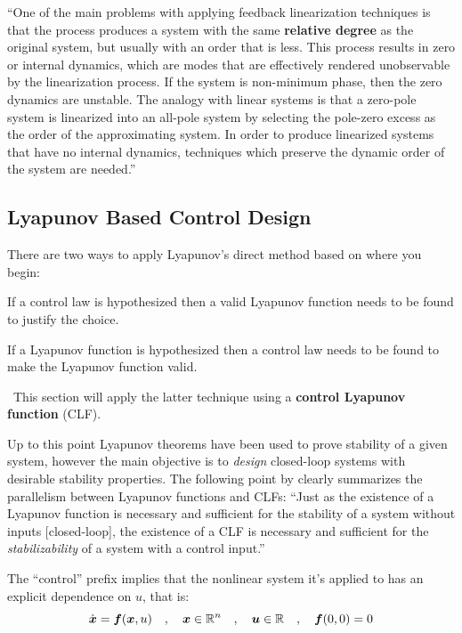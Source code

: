 \documentclass[12pt]{ucthesis}
\begin{document}
``One of the main problems with applying feedback linearization techniques is that the process produces a system with the same \textbf{relative degree} as the original system, but usually with an order that is less. This process results in zero or internal dynamics, which are modes that are effectively rendered unobservable by the linearization process. If the system is non-minimum phase, then the zero dynamics are unstable. The analogy with linear systems is that a zero-pole system is linearized into an all-pole system by selecting the pole-zero excess as the order of the approximating system. In order to produce linearized systems that have no internal dynamics, techniques which preserve the dynamic order of the system are needed.'' \citet{Med99}

\subsection{Lyapunov Based Control Design}
\label{sub: lyapunov_based} %
There are two ways to apply Lyapunov's direct method based on where you begin: \begin{inparaenum}[\itshape 1\upshape)] \item{If a control law is hypothesized then a valid Lyapunov function needs to be found to justify the choice.} \item{If a Lyapunov function is hypothesized then a control law needs to be found to make the Lyapunov function valid.}\end{inparaenum}~This section will apply the latter technique using a \textbf{control Lyapunov function} (CLF).%

Up to this point Lyapunov theorems have been used to prove stability of a given system, however the main objective is to \textit{design} closed-loop systems with desirable stability properties. 
The following point by \citet{Freeman1996a} clearly summarizes the parallelism between Lyapunov functions and CLFs: ``Just as the existence of a Lyapunov function is necessary and sufficient for the stability of a system without inputs [closed-loop], the existence of a CLF is necessary and sufficient for the \textit{stabilizability} of a system with a control input.''

The ``control'' prefix implies that the nonlinear system it's applied to has an explicit dependence on $u$, that is:
%
	\begin{equation}
		\dot{\boldsymbol{x}}=\boldsymbol{f}(\boldsymbol{x},u) \quad,\quad \boldsymbol{x}\in \mathbb{R}^n \quad,\quad \boldsymbol{u}\in \mathbb{R} \quad,\quad \boldsymbol{f}(0,0)=0
		\label{eq: clf_f}
	\end{equation} 
\end{document}
